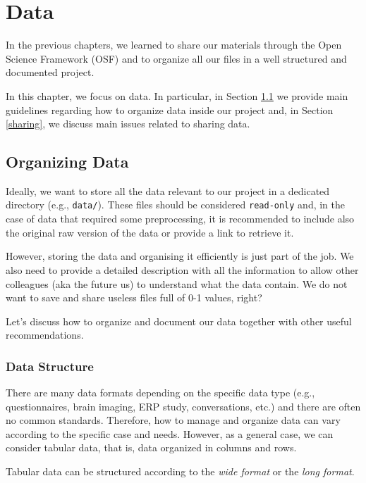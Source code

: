 \documentclass[
  11pt,
]{book}
\begin{document}
\hypertarget{data-chapter}{%
\chapter{Data}\label{data-chapter}}

In the previous chapters, we learned to share our materials through the Open Science Framework (OSF) and to organize all our files in a well structured and documented project.

In this chapter, we focus on data. In particular, in Section \ref{organizing} we provide main guidelines regarding how to organize data inside our project and, in Section \ref{sharing}, we discuss main issues related to sharing data.

\hypertarget{organizing}{%
\section{Organizing Data}\label{organizing}}

Ideally, we want to store all the data relevant to our project in a dedicated directory (e.g., \texttt{data/}). These files should be considered \texttt{read-only} and, in the case of data that required some preprocessing, it is recommended to include also the original raw version of the data or provide a link to retrieve it.

However, storing the data and organising it efficiently is just part of the job. We also need to provide a detailed description with all the information to allow other colleagues (aka the future us) to understand what the data contain. We do not want to save and share useless files full of 0-1 values, right?

Let's discuss how to organize and document our data together with other useful recommendations.

\hypertarget{data-structure}{%
\subsection{Data Structure}\label{data-structure}}

There are many data formats depending on the specific data type (e.g., questionnaires, brain imaging, ERP study, conversations, etc.) and there are often no common standards. Therefore, how to manage and organize data can vary according to the specific case and needs. However, as a general case, we can consider tabular data, that is, data organized in columns and rows.

Tabular data can be structured according to the \emph{wide format} or the \emph{long format}.
\end{document}
